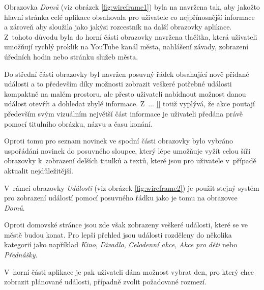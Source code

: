 \pagebreak
\begin{minipage}[t]{0.45\textwidth}
  Obrazovka \textit{Domů} (viz obrázek \ref{fig:wireframe1}) byla na navržena tak, aby jakožto hlavní stránka celé aplikace obsahovala pro uživatele
  co nejpřínosnější informace a zároveň aby sloužila jako jakýsi rozcestník na další obrazovky aplikace. Z~tohoto důvodu byla do horní části obrazovky
  navržena tlačítka, která uživateli umožňují rychlý proklik na YouTube kanál města, nahlášení závady, zobrazení úředních hodin nebo stránku služeb města.
  

  Do střední části obrazovky byl navržen posuvný řádek obsahující nově přidané události a to především díky možnosti zobrazit
  veškeré potřebné události kompaktně na malém prostoru, ale přesto uživateli nabídnout možnost danou událost otevřít a dohledat zbylé informace.
  Z~... \ref{} totiž vyplývá, že akce poutají především svým vizuálním největší část informace je uživateli předána právě pomocí titulního obrázku, názvu
  a času konání.
  
  Oproti tomu pro seznam novinek ve spodní části obrazovky bylo vybráno uspořádání novinek do posuvného sloupce, který lépe umožňuje 
  vyžít celou šíři obrazovky k~zobrazení delších titulků a textů, které jsou pro uživatele v~případě aktualit nejdůležitější.
  
  
  
  
  \bigskip
  V~rámci obrazovky \textit{Události} (viz obrázek \ref{fig:wireframe2}) je použit stejný systém pro zobrazení událostí pomocí posuvného řádku 
  jako je tomu na obrazovce \textit{Domů}.
  
  Oproti domovské stránce jsou zde však zobrazeny veškeré události, které se ve městě budou konat. Pro lepší přehled jsou události rozděleny 
  do několika kategorií jako například \textit{Kino}, \textit{Divadlo}, \textit{Celodenní akce}, \textit{Akce pro děti} nebo \textit{Přednášky}.
  
  V~horní části aplikace je pak uživateli dána možnost vybrat den, pro který chce zobrazit plánované události, případně zvolit požadované rozmezí.


\end{minipage}
